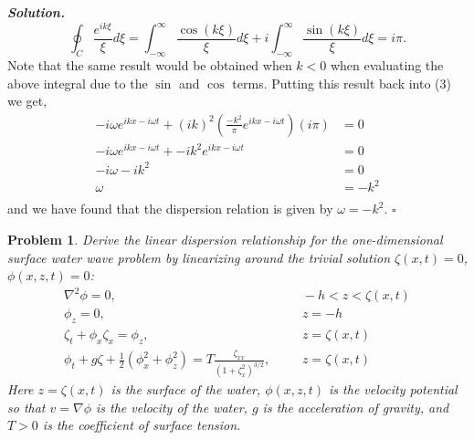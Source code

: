 \documentclass[12pt]{report}
\newtheorem{problem}{Problem}
\newenvironment{solution}[1][\it{Solution}]{\textbf{#1. } }{$\square$}
\begin{document}
\begin{solution}
    \[
        \oint_C \frac{e^{ik\xi}}{\xi}d\xi = \int_{-\infty}^{\infty} \frac{\cos(k\xi)}{\xi}d\xi + i\int_{-\infty}^{\infty} \frac{\sin(k\xi)}{\xi}d\xi = i\pi.
    \]    
    Note that the same result would be obtained when $k < 0$ when evaluating the above integral due to the $\sin$ and $\cos$ terms. Putting this result back into (3) we get,
    \begin{align*}
        -i\omega e^{i k x - i \omega t} + (ik)^2  \left( \frac{-k^2}{\pi} e^{ikx - i\omega t} \right)(i \pi) &= 0\\
        -i\omega e^{i k x - i \omega t} +  -ik^2 e^{ikx - i\omega t} &= 0\\
        -i\omega - ik^2 &= 0\\
        \omega &= -k^2\\
    \end{align*}
    and we have found that the dispersion relation is given by $\omega = -k^2$.
\end{solution}

\newpage



\begin{problem}
    Derive the linear dispersion relationship for the one-dimensional
surface water wave problem by linearizing around the trivial solution $\zeta(x,t)=0$, $\phi(x,z,t)=0$:
\begin{eqnarray*}
\nabla^2\phi=0,&& ~~~~-h<z<\zeta(x,t)\\
\phi_z=0, && ~~~~ z=-h\\
\zeta_t+\phi_x\zeta_x=\phi_z, && ~~~~z=\zeta(x,t)\\
\phi_t+g\zeta+\frac{1}{2}\left(\phi_x^2+\phi_z^2\right)=
T\frac{\zeta_{xx}}{\left(1+\zeta_x^2\right)^{3/2}}, && ~~~~z=\zeta(x,t)
\end{eqnarray*}
Here $z=\zeta(x,t)$ is the surface of the water,
$\phi(x,z,t)$ is the velocity potential so that $v=\nabla \phi$ is the velocity of the water, $g$ is
the acceleration of gravity, and $T>0$ is the coefficient of surface tension.
\end{problem}
\end{document}
